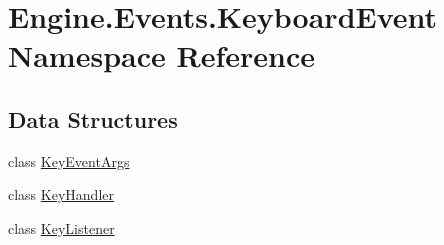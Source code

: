 \hypertarget{a00247}{}\section{Engine.\+Events.\+Keyboard\+Event Namespace Reference}
\label{a00247}
\subsection*{Data Structures}
\begin{DoxyCompactItemize}
\item 
class \hyperlink{a00362}{Key\+Event\+Args}
\item 
class \hyperlink{a00366}{Key\+Handler}
\item 
class \hyperlink{a00370}{Key\+Listener}
\end{DoxyCompactItemize}
